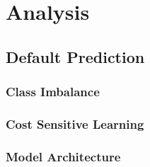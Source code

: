 \chapter{Analysis}\label{ch:5}

    \section{Default Prediction}
    
        \subsection{Class Imbalance}
        
        \subsection{Cost Sensitive Learning}
        
        \subsection{Model Architecture}
